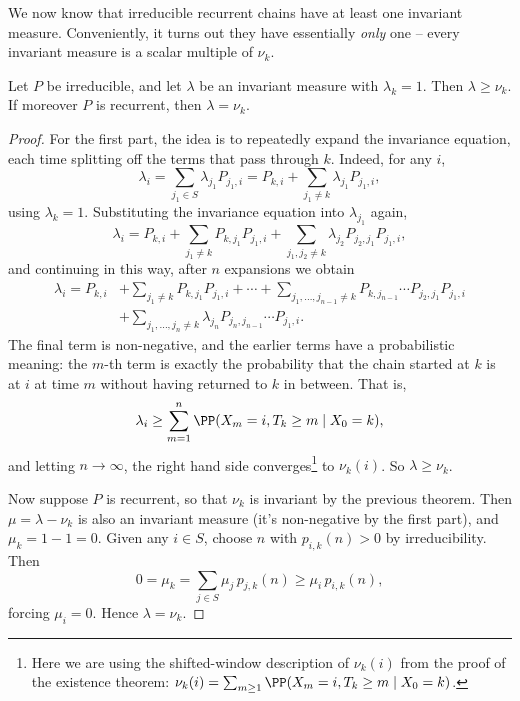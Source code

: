 We now know that irreducible recurrent chains have at least one invariant measure. Conveniently, it turns out they have essentially \emph{only} one -- every invariant measure is a scalar multiple of $\nu_k$.

\begin{theorem}
	Let $P$ be irreducible, and let $\lambda$ be an invariant measure with $\lambda_k = 1$. Then $\lambda \geq \nu_k$. If moreover $P$ is recurrent, then $\lambda = \nu_k$.
\end{theorem}
\begin{proof}
	For the first part, the idea is to repeatedly expand the invariance equation, each time splitting off the terms that pass through $k$. Indeed, for any $i$,
	$$
	\lambda_i = \sum_{j_1 \in S} \lambda_{j_1} P_{j_1, i} = P_{k, i} + \sum_{j_1 \neq k} \lambda_{j_1}P_{j_1, i},
	$$
	using $\lambda_k = 1$. Substituting the invariance equation into $\lambda_{j_1}$ again,
	$$
	\lambda_i = P_{k, i} + \sum_{j_1 \neq k} P_{k, j_1}P_{j_1, i} + \sum_{j_1, j_2 \neq k} \lambda_{j_2} P_{j_2, j_1}P_{j_1, i},
	$$
	and continuing in this way, after $n$ expansions we obtain
	\begin{align*}
	\lambda_i = P_{k, i} &+ \sum_{j_1 \neq k} P_{k, j_1}P_{j_1, i} + \cdots + \sum_{j_1, \dots, j_{n - 1} \neq k} P_{k, j_{n -1}} \cdots P_{j_2, j_1} P_{j_1, i} \\
	&+ \sum_{j_1, \dots, j_n \neq k} \lambda_{j_n} P_{j_n, j_{n - 1}} \cdots P_{j_1, i}.
	\end{align*}
	The final term is non-negative, and the earlier terms have a probabilistic meaning: the $m$-th term is exactly the probability that the chain started at $k$ is at $i$ at time $m$ without having returned to $k$ in between. That is,
	$$
	\lambda_i \geq \sum_{m = 1}^{n} \PP(X_m = i, T_k \geq m \mid X_0 = k),
	$$
	and letting $n \rightarrow \infty$, the right hand side converges\footnote{Here we are using the shifted-window description of $\nu_k(i)$ from the proof of the existence theorem: $\nu_k(i) = \sum_{m \geq 1} \PP(X_m = i, T_k \geq m \mid X_0 = k)$.} to $\nu_k(i)$. So $\lambda \geq \nu_k$.

	Now suppose $P$ is recurrent, so that $\nu_k$ is invariant by the previous theorem. Then $\mu = \lambda - \nu_k$ is also an invariant measure (it's non-negative by the first part), and $\mu_k = 1 - 1 = 0$. Given any $i \in S$, choose $n$ with $p_{i, k}(n) > 0$ by irreducibility. Then
	$$
	0 = \mu_k = \sum_{j \in S} \mu_j\, p_{j, k}(n) \geq \mu_i \, p_{i, k}(n),
	$$
	forcing $\mu_i = 0$. Hence $\lambda = \nu_k$.
\end{proof}

